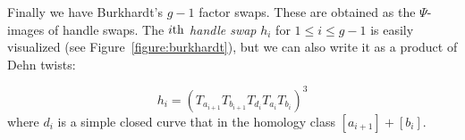 \documentclass[11pt]{article}
\begin{document}
Finally we have Burkhardt's $g-1$ factor swaps.  These are obtained as the 
$\Psi$-images of handle swaps.  The $i{\rm th}$ {\em handle 
swap} $h_i$ for $1\leq i\leq g-1$ is easily visualized 
(see Figure~\ref{figure:burkhardt}), but we can also write it as a product 
of Dehn twists: 

$$h_i=(T_{a_{i+1}}T_{b_{i+1}} T_{d_i}T_{a_i}T_{b_i})^3$$ 
where $d_i$ is a simple closed curve that in the homology class 
$[a_{i+1}]+[b_i]$.
\end{document}
